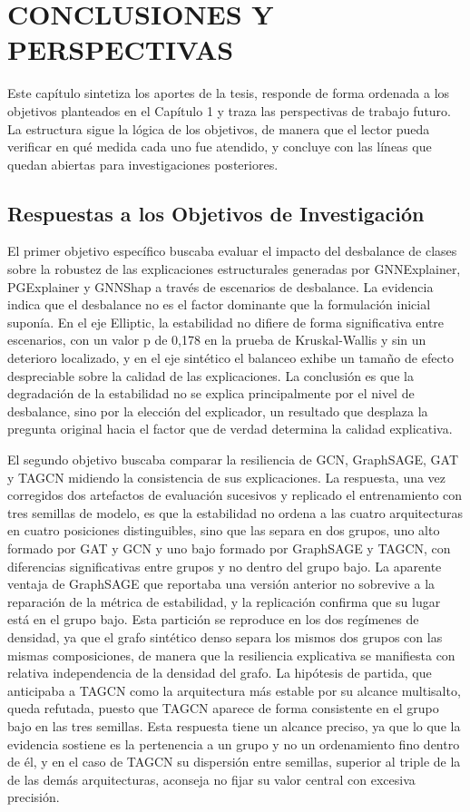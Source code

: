 \chapter{CONCLUSIONES Y PERSPECTIVAS}

Este capítulo sintetiza los aportes de la tesis, responde de forma ordenada a los objetivos planteados en el Capítulo 1 y traza las perspectivas de trabajo futuro. La estructura sigue la lógica de los objetivos, de manera que el lector pueda verificar en qué medida cada uno fue atendido, y concluye con las líneas que quedan abiertas para investigaciones posteriores.

\section{Respuestas a los Objetivos de Investigación}

El primer objetivo específico buscaba evaluar el impacto del desbalance de clases sobre la robustez de las explicaciones estructurales generadas por GNNExplainer, PGExplainer y GNNShap a través de escenarios de desbalance. La evidencia indica que el desbalance no es el factor dominante que la formulación inicial suponía. En el eje Elliptic, la estabilidad no difiere de forma significativa entre escenarios, con un valor p de 0,178 en la prueba de Kruskal-Wallis y sin un deterioro localizado, y en el eje sintético el balanceo exhibe un tamaño de efecto despreciable sobre la calidad de las explicaciones. La conclusión es que la degradación de la estabilidad no se explica principalmente por el nivel de desbalance, sino por la elección del explicador, un resultado que desplaza la pregunta original hacia el factor que de verdad determina la calidad explicativa.

El segundo objetivo buscaba comparar la resiliencia de GCN, GraphSAGE, GAT y TAGCN midiendo la consistencia de sus explicaciones. La respuesta, una vez corregidos dos artefactos de evaluación sucesivos y replicado el entrenamiento con tres semillas de modelo, es que la estabilidad no ordena a las cuatro arquitecturas en cuatro posiciones distinguibles, sino que las separa en dos grupos, uno alto formado por GAT y GCN y uno bajo formado por GraphSAGE y TAGCN, con diferencias significativas entre grupos y no dentro del grupo bajo. La aparente ventaja de GraphSAGE que reportaba una versión anterior no sobrevive a la reparación de la métrica de estabilidad, y la replicación confirma que su lugar está en el grupo bajo. Esta partición se reproduce en los dos regímenes de densidad, ya que el grafo sintético denso separa los mismos dos grupos con las mismas composiciones, de manera que la resiliencia explicativa se manifiesta con relativa independencia de la densidad del grafo. La hipótesis de partida, que anticipaba a TAGCN como la arquitectura más estable por su alcance multisalto, queda refutada, puesto que TAGCN aparece de forma consistente en el grupo bajo en las tres semillas. Esta respuesta tiene un alcance preciso, ya que lo que la evidencia sostiene es la pertenencia a un grupo y no un ordenamiento fino dentro de él, y en el caso de TAGCN su dispersión entre semillas, superior al triple de la de las demás arquitecturas, aconseja no fijar su valor central con excesiva precisión.

